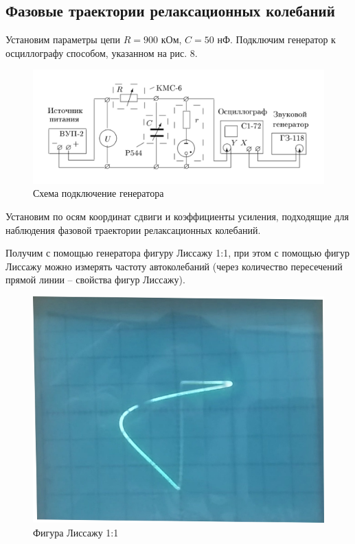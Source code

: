 \subsection{Фазовые траектории релаксационных колебаний}

Установим параметры цепи $R = 900$ кОм, $C = 50$ нФ. Подключим генератор к осциллографу способом, указанном на рис. 8.

\begin{figure}[h!]
    \centering
    \includegraphics[width = 13 cm]{images/4.png}
    \caption{Схема подключение генератора}
    \label{gen}
\end{figure}

Установим по осям координат сдвиги и коэффициенты усиления, подходящие для наблюдения фазовой траектории релаксационных колебаний. 

Получим с помощью генератора фигуру Лиссажу 1:1, при этом с помощью фигур Лиссажу можно измерять частоту автоколебаний (через количество пересечений прямой линии -- свойства фигур Лиссажу).

\begin{figure}[h!]
    \centering
    \includegraphics[width = 10 cm]{images/liss1.png}
    \caption{Фигура Лиссажу 1:1}
    \label{liss1}
\end{figure}

